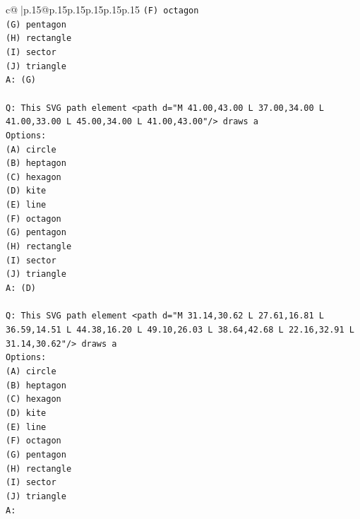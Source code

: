 \documentclass{article}
\begin{document}
{\begin{supertabular}{c@{$\;$}|p{.15\linewidth}@{}p{.15\linewidth}p{.15\linewidth}p{.15\linewidth}p{.15\linewidth}p{.15\linewidth}}
{{{\texttt{(F) octagon} \\
\texttt{(G) pentagon} \\
\texttt{(H) rectangle} \\
\texttt{(I) sector} \\
\texttt{(J) triangle} \\
\texttt{A: (G)} \\
\\ 
\texttt{Q: This SVG path element <path d="M 41.00,43.00 L 37.00,34.00 L 41.00,33.00 L 45.00,34.00 L 41.00,43.00"/> draws a} \\
\texttt{Options:} \\
\texttt{(A) circle} \\
\texttt{(B) heptagon} \\
\texttt{(C) hexagon} \\
\texttt{(D) kite} \\
\texttt{(E) line} \\
\texttt{(F) octagon} \\
\texttt{(G) pentagon} \\
\texttt{(H) rectangle} \\
\texttt{(I) sector} \\
\texttt{(J) triangle} \\
\texttt{A: (D)} \\
\\ 
\texttt{Q: This SVG path element <path d="M 31.14,30.62 L 27.61,16.81 L 36.59,14.51 L 44.38,16.20 L 49.10,26.03 L 38.64,42.68 L 22.16,32.91 L 31.14,30.62"/> draws a} \\
\texttt{Options:} \\
\texttt{(A) circle} \\
\texttt{(B) heptagon} \\
\texttt{(C) hexagon} \\
\texttt{(D) kite} \\
\texttt{(E) line} \\
\texttt{(F) octagon} \\
\texttt{(G) pentagon} \\
\texttt{(H) rectangle} \\
\texttt{(I) sector} \\
\texttt{(J) triangle} \\
\texttt{A:} \\
            }
        }
    }
     \\ \\


\end{supertabular}}
\end{document}
